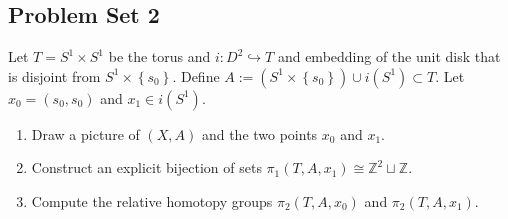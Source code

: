 \subsection{Problem Set 2}
    \begin{problem}[]
        Let $T = S^{1} \times S^{1}$ be the torus and
        $i \colon D^2 \hookrightarrow T$ and embedding of
        the unit disk that is disjoint from $S^{1}\times 
        \left\{ s_0 \right\} $. Define
        $A := \left( S^{1} \times \left\{ s_0 \right\}  \right) 
        \cup i \left( S^{1} \right) \subset T$.
        Let $x_0 = \left( s_0,s_0 \right) $ and
        $x_1 \in i \left( S^{1} \right) $.
        \begin{enumerate}
            \item Draw a picture of $\left( X,A \right) $ 
                and the two points $x_0$ and $x_1$.
            \item Construct an explicit bijection of
                sets
                $\pi_1 \left( T,A,x_1 \right) \cong
                \mathbb{Z}^2 \sqcup \mathbb{Z}$.
            \item Compute the relative homotopy groups
                $\pi_2 \left( T,A,x_0 \right) $ and
                $\pi_2 \left( T,A,x_1 \right) $.
        \end{enumerate}
    \end{problem}

